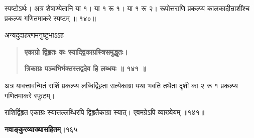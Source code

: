 \documentclass[11pt, openany]{book}
\begin{document}
\begin{sloppypar}
\hangindent=0.2in \hspace{0.2in}स्पष्टोऽर्थः। अत्र शेषाण्येतानि या १। या १ रू १। या १ रू २। रूपोत्तराणि प्रकल्प्य कालकादीन्राशींश्च प्रकल्प्य गणितमाकरे स्पष्टम् ॥ १४०॥

\hangindent=0.2in \hspace{0.2in}अन्यदुदाहरणमनुष्टुभाऽऽह\textendash

\begin{quote}
\hspace{1in}\textbf{एकाग्रो द्विहृतः कः स्याद्द्विकाग्रस्त्रिसमुद्धृतः।}

\hspace{1in}\textbf{त्रिकाग्रः पञ्चभिर्भक्तस्तद्वदेव हि लब्धयः ॥ १४१ ॥}
\end{quote}

\hangindent=0.2in \hspace{0.2in}अत्र यावत्तावन्मितं राशिं प्रकल्प्य लब्धिर्द्विहृता सत्येकाग्रा यथा भवति तथैता दृशी का २ रू १ प्रकल्प्य गणितमाकरे स्फुटम्।

\hangindent=0.2in \hspace{0.2in}राशिर्द्विहृत एकाग्रः स्यात्तल्लब्धिरपि द्विहृतैकाग्रा स्यात्। एवमग्रेऽपि व्याख्येयम् ॥१४१॥
\end{sloppypar}
\thispagestyle{empty}
\newpage

\onehalfspacing
\hspace{2in}\textbf{नवाङ्कुरव्याख्यासहितम्।}\hspace{2in}१६५

\vspace{5mm}
\end{document}
